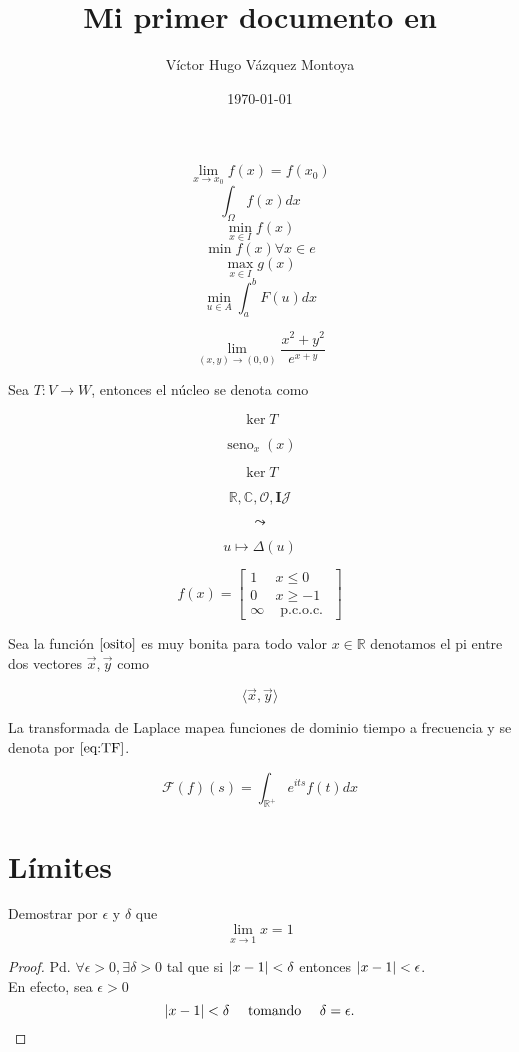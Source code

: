 \documentclass{book}
\title{Mi primer  documento en \LaTeXe}
\author{Víctor Hugo Vázquez Montoya}
\date{\small{\today}}
\DeclareMathOperator*{\seno}{seno}
\newcommand{\R}{\mathbb{R}}
\newcommand{\producin}[2]{\langle #1, #2 \rangle}
\newcommand{\TF}[1]{\int_{\R^+}e^{its}#1dx}
\begin{document}
\[\lim_{x\to x_0}f(x)=f(x_{0})\]
\[\int_{\Omega}f(x)dx\]
\[\min_{x\in I}f(x)\]
\[ \min f(x) \forall x \in e \]
\[\max_{x\in I}g(x)\]
\[\min_{u\in A}\int_{a}^{b}F(u)dx\]


\[ \lim_{(x,y) \to (0,0)} \frac{x^2+y^2}{e^{x+y}}\]

Sea $T: V \to W$, entonces el núcleo se denota como

\[ \ker T \]

\[ \seno_{x} (x) \]

\[ \boxed{\ker T} \]

\[ \mathbb{R} , \mathbb{C}, \mathcal{O} , \mathbf{I} \mathcal{J}\]

\[ \leadsto \]

\[ u \mapsto \Delta (u) \]

\begin{equation} \label{osito}
    f(x) = \left[
    \begin{array}{cc}
          1 &  x \leq 0\\
         0  &  x \geq -1 \\
         \infty & \text{ p.c.o.c. }
    \end{array}\right]
\end{equation}

Sea la función $\eqref{osito}$ es muy bonita para todo valor $x \in \R$ denotamos el pi entre dos vectores $\Vec{x}, \Vec{y}$ como 

\[ \producin{\Vec{x}}{\Vec{y}} \]

La transformada de Laplace mapea funciones de dominio tiempo a frecuencia y se denota por $\eqref{eq:TF}$.

\begin{equation}\label{eq:TF}
    \mathcal{F}(f)(s)=\TF{f(t)}
\end{equation}



\section{Límites}
Demostrar por $\epsilon$ y $\delta$ que 
\[ \lim_{x \to 1} x =1 \]

\begin{proof}
Pd. $\forall \epsilon >0, \exists \delta>0  $ tal que si $\abs{x-1}<\delta$ entonces $\abs{x-1}<\epsilon$.\\ 
En efecto, sea $\epsilon >0$
\begin{equation}
    \abs{x-1}<\delta \quad \text{ tomando } \quad \delta=\epsilon.  
\end{equation}

\end{proof}
\end{document}
